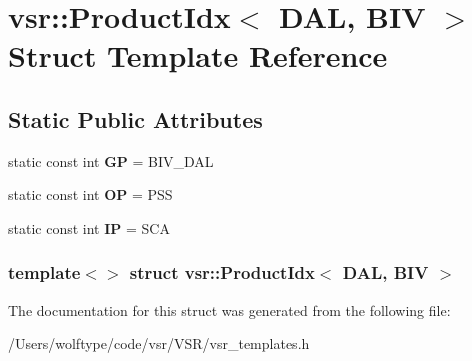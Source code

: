 \hypertarget{structvsr_1_1_product_idx_3_01_d_a_l_00_01_b_i_v_01_4}{\section{vsr\-:\-:Product\-Idx$<$ D\-A\-L, B\-I\-V $>$ Struct Template Reference}
\label{structvsr_1_1_product_idx_3_01_d_a_l_00_01_b_i_v_01_4}
}
\subsection*{Static Public Attributes}
\begin{DoxyCompactItemize}
\item 
\hypertarget{structvsr_1_1_product_idx_3_01_d_a_l_00_01_b_i_v_01_4_a0420a41ed9d15f38bab26f9898f2d38f}{static const int {\bfseries G\-P} = B\-I\-V\-\_\-\-D\-A\-L}\label{structvsr_1_1_product_idx_3_01_d_a_l_00_01_b_i_v_01_4_a0420a41ed9d15f38bab26f9898f2d38f}

\item 
\hypertarget{structvsr_1_1_product_idx_3_01_d_a_l_00_01_b_i_v_01_4_a827d1c47a34199ee6779871f450ec5a1}{static const int {\bfseries O\-P} = P\-S\-S}\label{structvsr_1_1_product_idx_3_01_d_a_l_00_01_b_i_v_01_4_a827d1c47a34199ee6779871f450ec5a1}

\item 
\hypertarget{structvsr_1_1_product_idx_3_01_d_a_l_00_01_b_i_v_01_4_a85b1362584a94cc182badc58c48dc4cb}{static const int {\bfseries I\-P} = S\-C\-A}\label{structvsr_1_1_product_idx_3_01_d_a_l_00_01_b_i_v_01_4_a85b1362584a94cc182badc58c48dc4cb}

\end{DoxyCompactItemize}
\subsubsection*{template$<$$>$ struct vsr\-::\-Product\-Idx$<$ D\-A\-L, B\-I\-V $>$}



The documentation for this struct was generated from the following file\-:\begin{DoxyCompactItemize}
\item 
/\-Users/wolftype/code/vsr/\-V\-S\-R/vsr\-\_\-templates.\-h\end{DoxyCompactItemize}
